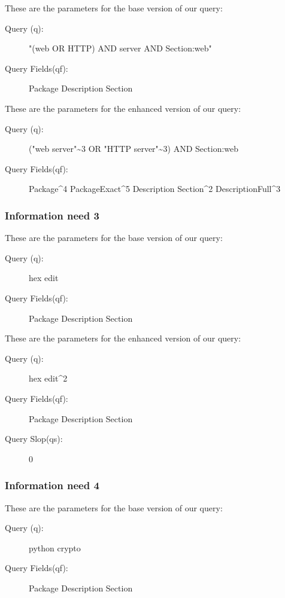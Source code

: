 These are the parameters for the base version of our query:

\begin{description}

    \item [Query (q):] "(web OR HTTP) AND server AND Section:web"
    \item [Query Fields(qf):] Package Description Section
\end{description}

These are the parameters for the enhanced version of our query:

\begin{description}
    \item [Query (q):] ("web server"\~{}3 OR "HTTP server"\~{}3) AND Section:web
    \item [Query Fields(qf):] Package\^{}4 PackageExact\^{}5 Description Section\^{}2 DescriptionFull\^{}3
\end{description}

\subsubsection{Information need 3}

These are the parameters for the base version of our query:

\begin{description}
    \item[Query (q):] hex edit
    \item[Query Fields(qf):] Package Description Section
\end{description}

These are the parameters for the enhanced version of our query:

\begin{description}
    \item[Query (q):] hex edit\^{}2
    \item[Query Fields(qf):] Package Description Section
    \item[Query Slop(qs):] 0
\end{description}

\subsubsection{Information need 4}

These are the parameters for the base version of our query:

\begin{description}
    \item[Query (q):] python crypto
    \item[Query Fields(qf):] Package Description Section
\end{description}

